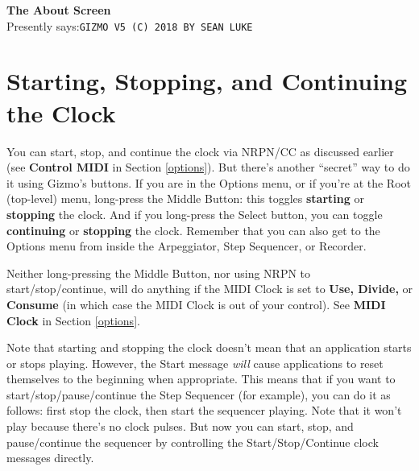 \documentclass{article}
\begin{document}
\begin{description}
	\item{\bf The About Screen}\\
		Presently says:\quad \texttt{GIZMO V5 (C) 2018 BY SEAN LUKE}
	\end{description}

\clearpage



\section{Starting, Stopping, and Continuing the Clock }
	\label{startingclock}

		You can start, stop, and continue the clock via NRPN/CC as discussed earlier (see {\bf Control MIDI} in Section \ref{options}).   But there's another ``secret'' way to do it using Gizmo's buttons.  If you are in the Options menu, or if you're at the Root (top-level) menu, long-press the Middle Button: this toggles {\bf starting} or {\bf stopping} the clock.  And if you long-press the Select button, you can toggle {\bf continuing} or {\bf stopping} the clock.  Remember that you can also get to the Options menu from inside the Arpeggiator, Step Sequencer, or Recorder.
		
		Neither long-pressing the Middle Button, nor using NRPN to start/stop/continue, will do anything if the MIDI Clock is set to {\bf Use, Divide,} or {\bf Consume} (in which case the MIDI Clock is out of your control).  See {\bf MIDI Clock} in Section \ref{options}.
				
		Note that starting and stopping the clock doesn't mean that an application starts or stops playing.  However, the Start message {\it will} cause applications to reset themselves to the beginning when appropriate.   This means that if you want to start/stop/pause/continue the Step Sequencer (for example), you can do it as follows: first stop the clock, then start the sequencer playing.  Note that it won't play because there's no clock pulses.  But now you can start, stop, and pause/continue the sequencer by controlling the Start/Stop/Continue clock messages directly.
		
\end{document}

